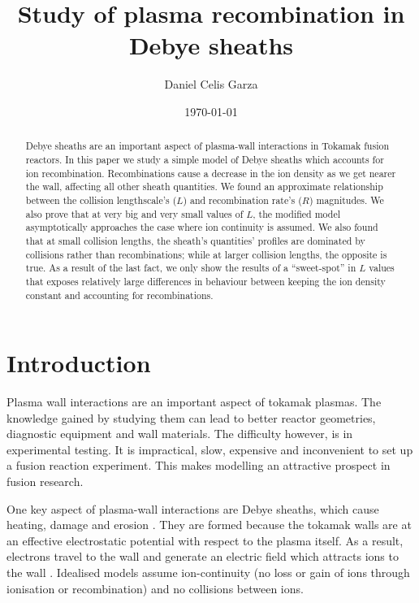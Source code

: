 \documentclass[aip,apl,reprint]{revtex4-1}
\begin{document}
	\title{Study of plasma recombination in Debye sheaths}
	\date{\today}
	\author{Daniel Celis Garza}
	\begin{abstract}
		Debye sheaths are an important aspect of plasma-wall interactions in Tokamak fusion reactors. In this paper we study a simple model of Debye sheaths which accounts for ion recombination. Recombinations cause a decrease in the ion density as we get nearer the wall, affecting all other sheath quantities. We found an approximate relationship between the collision lengthscale's ($L$) and recombination rate's ($R$) magnitudes. We also prove that at very big and very small values of $L$, the modified model asymptotically approaches the case where ion continuity is assumed. We also found that at small collision lengths, the sheath's quantities' profiles are dominated by collisions rather than recombinations; while at larger collision lengths, the opposite is true. As a result of the last fact, we only show the results of a ``sweet-spot'' in $L$ values that exposes relatively large differences in behaviour between keeping the ion density constant and accounting for recombinations.
	\end{abstract}
	\maketitle
	\section{Introduction}
	Plasma wall interactions are an important aspect of tokamak plasmas. The knowledge gained by studying them can lead to better reactor geometries, diagnostic equipment and wall materials. The difficulty however, is in experimental testing. It is impractical, slow, expensive and inconvenient to set up a fusion reaction experiment. This makes modelling an attractive prospect in fusion research.
	
	One key aspect of plasma-wall interactions are Debye sheaths, which cause heating, damage and erosion \cite{sheath}. They are formed because the tokamak walls are at an effective electrostatic potential with respect to the plasma itself. As a result, electrons travel to the wall and generate an electric field which attracts ions to the wall \cite{bohm}. Idealised models assume ion-continuity (no loss or gain of ions through ionisation or recombination) and no collisions between ions. 
	
\end{document}
